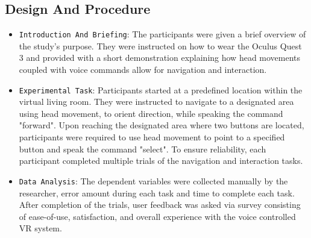\documentclass[manuscript, screen, review]{acmart}
\begin{document}
\subsection{Design And Procedure}
\begin{itemize}
\item {\texttt{Introduction And Briefing}}: The participants were given a brief overview of the study's purpose. They were instructed on how to wear the Oculus Quest 3 and provided with a short demonstration explaining how head movements coupled with voice commands allow for navigation and interaction.
\item {\texttt{Experimental Task}}: Participants started at a predefined location within the virtual living room. They were instructed to navigate to a designated area using head movement, to orient direction, while speaking the command "forward". Upon reaching the designated area where two buttons are located, participants were required to use head movement to point to a specified button and speak the command "select". To ensure reliability, each participant completed multiple trials of the navigation and interaction tasks.
\item {\texttt{Data Analysis}}: The dependent variables were collected manually by the researcher, error amount during each task and time to complete each task. After completion of the trials, user feedback was asked via survey consisting of ease-of-use, satisfaction, and overall experience with the voice controlled VR system.  
\end{itemize}





\end{document}
